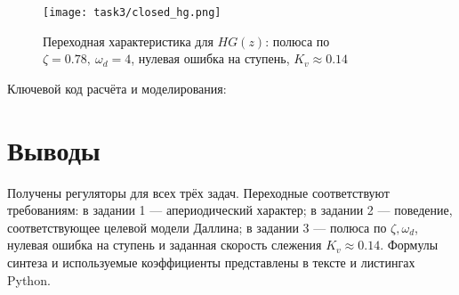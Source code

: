 \begin{figure}[H]
    \centering
    \texttt{[image: task3/closed\_hg.png]}
    \caption{Переходная характеристика для $HG(z)$: полюса по $\zeta=0.78,\ \omega_d=4$, нулевая ошибка на ступень, $K_v\approx0.14$}
\end{figure}

\noindent Ключевой код расчёта и моделирования:


\section{Выводы}
Получены регуляторы для всех трёх задач. Переходные соответствуют требованиям: в задании 1 — апериодический характер; в задании 2 — поведение, соответствующее целевой модели Даллина; в задании 3 — полюса по $\zeta,\omega_d$, нулевая ошибка на ступень и заданная скорость слежения $K_v\approx0.14$. Формулы синтеза и используемые коэффициенты представлены в тексте и листингах Python.


